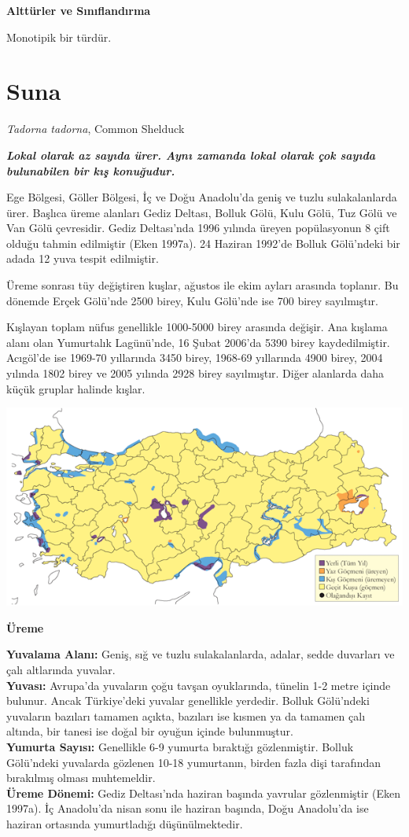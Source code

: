\documentclass[
  letterpaper,
  DIV=11,
  numbers=noendperiod]{scrreprt}
\begin{document}
\textbf{Alttürler ve Sınıflandırma}

Monotipik bir türdür.

\section{Suna}\label{suna}

\emph{Tadorna tadorna}, Common Shelduck

\textbf{\emph{Lokal olarak az sayıda ürer. Aynı zamanda lokal olarak çok
sayıda bulunabilen bir kış konuğudur.}}

Ege Bölgesi, Göller Bölgesi, İç ve Doğu Anadolu'da geniş ve tuzlu
sulakalanlarda ürer. Başlıca üreme alanları Gediz Deltası, Bolluk Gölü,
Kulu Gölü, Tuz Gölü ve Van Gölü çevresidir. Gediz Deltası'nda 1996
yılında üreyen popülasyonun 8 çift olduğu tahmin edilmiştir (Eken
1997a). 24 Haziran 1992'de Bolluk Gölü'ndeki bir adada 12 yuva tespit
edilmiştir.

Üreme sonrası tüy değiştiren kuşlar, ağustos ile ekim ayları arasında
toplanır. Bu dönemde Erçek Gölü'nde 2500 birey, Kulu Gölü'nde ise 700
birey sayılmıştır.

Kışlayan toplam nüfus genellikle 1000-5000 birey arasında değişir. Ana
kışlama alanı olan Yumurtalık Lagünü'nde, 16 Şubat 2006'da 5390 birey
kaydedilmiştir. Acıgöl'de ise 1969-70 yıllarında 3450 birey, 1968-69
yıllarında 4900 birey, 2004 yılında 1802 birey ve 2005 yılında 2928
birey sayılmıştır. Diğer alanlarda daha küçük gruplar halinde kışlar.

\includegraphics{images/harita_Page_012.png}

\textbf{Üreme}

\textbf{Yuvalama Alanı:} Geniş, sığ ve tuzlu sulakalanlarda, adalar,
sedde duvarları ve çalı altlarında yuvalar.\\
\textbf{Yuvası:} Avrupa'da yuvaların çoğu tavşan oyuklarında, tünelin
1-2 metre içinde bulunur. Ancak Türkiye'deki yuvalar genellikle
yerdedir. Bolluk Gölü'ndeki yuvaların bazıları tamamen açıkta, bazıları
ise kısmen ya da tamamen çalı altında, bir tanesi ise doğal bir oyuğun
içinde bulunmuştur.\\
\textbf{Yumurta Sayısı:} Genellikle 6-9 yumurta bıraktığı gözlenmiştir.
Bolluk Gölü'ndeki yuvalarda gözlenen 10-18 yumurtanın, birden fazla dişi
tarafından bırakılmış olması muhtemeldir.\\
\textbf{Üreme Dönemi:} Gediz Deltası'nda haziran başında yavrular
gözlenmiştir (Eken 1997a). İç Anadolu'da nisan sonu ile haziran başında,
Doğu Anadolu'da ise haziran ortasında yumurtladığı düşünülmektedir.
\end{document}
